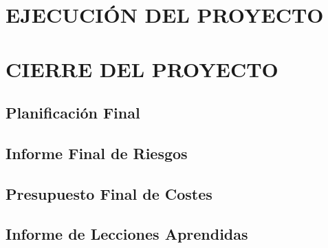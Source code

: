 \newpage
\section{EJECUCIÓN DEL PROYECTO}




\newpage
\section{CIERRE DEL PROYECTO}

\subsection{Planificación Final}


\subsection{Informe Final de Riesgos}

\subsection{Presupuesto Final de Costes}



\subsection{Informe de Lecciones Aprendidas}

